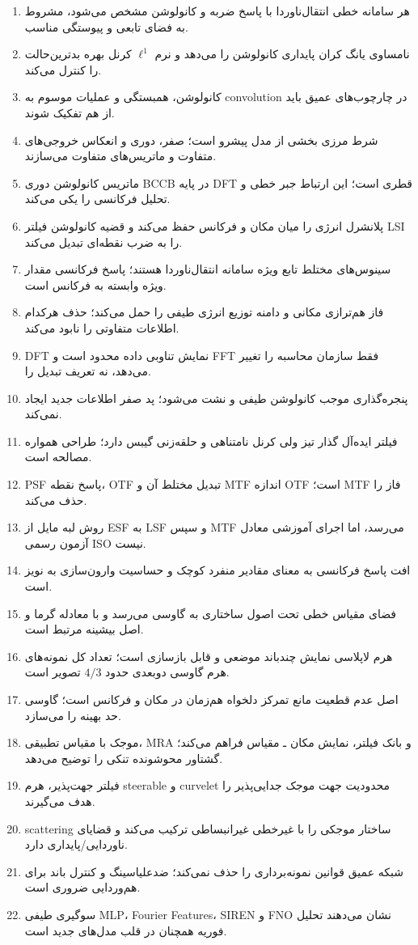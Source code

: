 \begin{enumerate}
\item هر سامانه خطی انتقال‌ناوردا با پاسخ ضربه و کانولوشن مشخص می‌شود، مشروط به فضای تابعی و پیوستگی مناسب.
\item نامساوی یانگ کران پایداری کانولوشن را می‌دهد و نرم \(\ell^1\) کرنل بهره بدترین‌حالت را کنترل می‌کند.
\item کانولوشن، همبستگی و عملیات موسوم به convolution در چارچوب‌های عمیق باید از هم تفکیک شوند.
\item شرط مرزی بخشی از مدل پیشرو است؛ صفر، دوری و انعکاس خروجی‌های متفاوت و ماتریس‌های متفاوت می‌سازند.
\item ماتریس کانولوشن دوری BCCB در پایه DFT قطری است؛ این ارتباط جبر خطی و تحلیل فرکانسی را یکی می‌کند.
\item پلانشرل انرژی را میان مکان و فرکانس حفظ می‌کند و قضیه کانولوشن فیلتر LSI را به ضرب نقطه‌ای تبدیل می‌کند.
\item سینوس‌های مختلط تابع ویژه سامانه انتقال‌ناوردا هستند؛ پاسخ فرکانسی مقدار ویژه وابسته به فرکانس است.
\item فاز هم‌ترازی مکانی و دامنه توزیع انرژی طیفی را حمل می‌کند؛ حذف هرکدام اطلاعات متفاوتی را نابود می‌کند.
\item DFT نمایش تناوبی داده محدود است و FFT فقط سازمان محاسبه را تغییر می‌دهد، نه تعریف تبدیل را.
\item پنجره‌گذاری موجب کانولوشن طیفی و نشت می‌شود؛ پد صفر اطلاعات جدید ایجاد نمی‌کند.
\item فیلتر ایده‌آل گذار تیز ولی کرنل نامتناهی و حلقه‌زنی گیبس دارد؛ طراحی همواره مصالحه است.
\item PSF پاسخ نقطه، OTF تبدیل مختلط آن و MTF اندازه OTF است؛ MTF فاز را حذف می‌کند.
\item روش لبه مایل از ESF به LSF و سپس MTF می‌رسد، اما اجرای آموزشی معادل آزمون رسمی ISO نیست.
\item افت پاسخ فرکانسی به معنای مقادیر منفرد کوچک و حساسیت وارون‌سازی به نویز است.
\item فضای مقیاس خطی تحت اصول ساختاری به گاوسی می‌رسد و با معادله گرما و اصل بیشینه مرتبط است.
\item هرم لاپلاسی نمایش چندباند موضعی و قابل بازسازی است؛ تعداد کل نمونه‌های هرم گاوسی دوبعدی حدود \(4/3\) تصویر است.
\item اصل عدم قطعیت مانع تمرکز دلخواه هم‌زمان در مکان و فرکانس است؛ گاوسی حد بهینه را می‌سازد.
\item موجک با مقیاس تطبیقی، MRA و بانک فیلتر، نمایش مکان ـ مقیاس فراهم می‌کند؛ گشتاور محوشونده تنکی را توضیح می‌دهد.
\item فیلتر جهت‌پذیر، هرم steerable و curvelet محدودیت جهت موجک جدایی‌پذیر را هدف می‌گیرند.
\item scattering ساختار موجکی را با غیرخطی غیرانبساطی ترکیب می‌کند و قضایای ناوردایی/پایداری دارد.
\item شبکه عمیق قوانین نمونه‌برداری را حذف نمی‌کند؛ ضدعلیاسینگ و کنترل باند برای هم‌وردایی ضروری است.
\item سوگیری طیفی MLP، Fourier Features، SIREN و FNO نشان می‌دهند تحلیل فوریه همچنان در قلب مدل‌های جدید است.
\end{enumerate}

